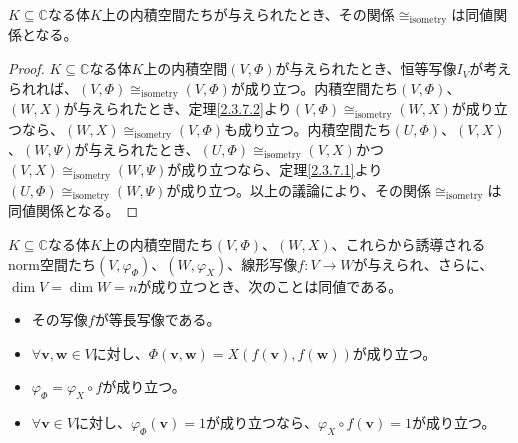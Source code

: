 \documentclass[dvipdfmx]{jsarticle}
\begin{document}
\begin{thm}\label{2.3.7.3}
$K \subseteq \mathbb{C}$なる体$K$上の内積空間たちが与えられたとき、その関係$\cong_{\mathrm{isometry}}$は同値関係となる。
\end{thm}
\begin{proof}
$K \subseteq \mathbb{C}$なる体$K$上の内積空間$(V,\varPhi )$が与えられたとき、恒等写像$I_{V}$が考えられれば、$(V,\varPhi ) \cong_{\mathrm{isometry}}(V,\varPhi )$が成り立つ。内積空間たち$(V,\varPhi )$、$(W,X)$が与えられたとき、定理\ref{2.3.7.2}より$(V,\varPhi ) \cong_{\mathrm{isometry}}(W,X)$が成り立つなら、$(W,X) \cong_{\mathrm{isometry}}(V,\varPhi )$も成り立つ。内積空間たち$(U,\varPhi )$、$(V,X)$、$(W,\varPsi )$が与えられたとき、$(U,\varPhi ) \cong_{\mathrm{isometry}}(V,X)$かつ$(V,X) \cong_{\mathrm{isometry}}(W,\varPsi )$が成り立つなら、定理\ref{2.3.7.1}より$(U,\varPhi ) \cong_{\mathrm{isometry}}(W,\varPsi )$が成り立つ。以上の議論により、その関係$\cong_{\mathrm{isometry}}$は同値関係となる。
\end{proof}
\begin{thm}\label{2.3.7.4}
$K \subseteq \mathbb{C}$なる体$K$上の内積空間たち$(V,\varPhi )$、$(W,X)$、これらから誘導されるnorm空間たち$\left( V,\varphi_{\varPhi } \right)$、$\left( W,\varphi_{X} \right)$、線形写像$f:V \rightarrow W$が与えられ、さらに、$\dim V = \dim W = n$が成り立つとき、次のことは同値である。
\begin{itemize}
\item
  その写像$f$が等長写像である。
\item
  $\forall\mathbf{v},\mathbf{w} \in V$に対し、$\varPhi \left( \mathbf{v},\mathbf{w} \right) = X\left( f\left( \mathbf{v} \right),f\left( \mathbf{w} \right) \right)$が成り立つ。
\item
  $\varphi_{\varPhi } = \varphi_{X} \circ f$が成り立つ。
\item
  $\forall\mathbf{v} \in V$に対し、$\varphi_{\varPhi }\left( \mathbf{v} \right) = 1$が成り立つなら、$\varphi_{X} \circ f\left( \mathbf{v} \right) = 1$が成り立つ。
\end{itemize}
\end{thm}
\end{document}
